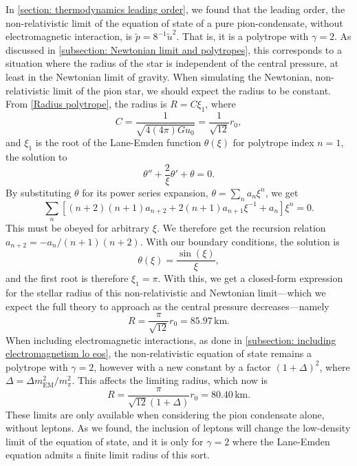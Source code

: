 In \autoref{section: thermodynamics leading order}, we found that the leading order, the non-relativistic limit of the equation of state of a pure pion-condensate, without electromagnetic interaction, is $\tilde p =8^{-1} \tilde u^2$.
That is, it is a polytrope with $\gamma = 2$.
As discussed in \autoref{subsection: Newtonian limit and polytropes}, this corresponds to a situation where the radius of the star is independent of the central pressure, at least in the Newtonian limit of gravity.
When simulating the Newtonian, non-relativistic limit of the pion star, we should expect the radius to be constant.
From \autoref{Radius polytrope}, the radius is $R = C \xi_1$, where
%
\begin{equation}
    C = \frac{1}{\sqrt{4(4\pi ) G u_0}} = \frac{1}{\sqrt{12}}r_0,
\end{equation}
%
and $\xi_1$ is the root of the Lane-Emden function $\theta(\xi)$ for polytrope index $n=1$, the solution to
%
\begin{equation}
    \theta'' + \frac{2}{\xi} \theta' + \theta = 0.
\end{equation}
%
By substituting $\theta$ for its power series expansion, $\theta = \sum_n a_n \xi^n$, we get
%
\begin{equation}
    \sum_n \left[ (n+2)(n+1) a_{n+2} + 2(n+1) a_{n+1} \xi^{-1} + a_n \right] \xi^n = 0.
\end{equation}
%
This must be obeyed for arbitrary $\xi$.
We therefore get the recursion relation $a_{n+2} = - a_n / (n+1)(n+2)$.
With our boundary conditions, the solution is
%
\begin{equation}
    \theta(\xi) = \frac{\sin(\xi)}{\xi},
\end{equation}
%
and the first root is therefore $\xi_1 = \pi$.
With this, we get a closed-form expression for the stellar radius of this non-relativistic and Newtonian limit---which we expect the full theory to approach as the central pressure decreases---namely
%
\begin{equation}
    \label{radius pion star nr limit}
    R = \frac{\pi}{\sqrt{12}} r_0 = 85.97 \, \text{km}.
\end{equation}
%
When including electromagnetic interactions, as done in \autoref{subsection: including electromagnetism lo eos}, the non-relativistic equation of state remains a polytrope with $\gamma=2$, however with a new constant by a factor $(1+\Delta)^2$, where $\Delta = \Delta m^2_\text{EM}/m_\pi^2$.
This affects the limiting radius, which now is
%
\begin{equation}
    \label{maximum mass pion star with em interaction}
    R = \frac{\pi}{\sqrt{12}(1 + \Delta)} r_0 = 80.40 \, \text{km}.
\end{equation}
%
These limits are only available when considering the pion condensate alone, without leptons.
As we found, the inclusion of leptons will change the low-density limit of the equation of state, and it is only for $\gamma=2$ where the Lane-Emden equation admits a finite limit radius of this sort.



